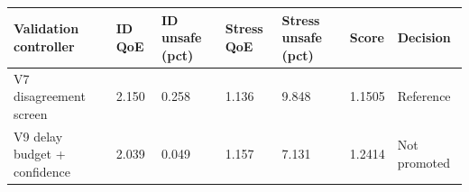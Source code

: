 \begin{tabular}{lllllll}
\toprule
Validation controller & ID QoE & ID unsafe (pct) & Stress QoE & Stress unsafe (pct) & Score & Decision \\
\midrule
V7 disagreement screen & 2.150 & 0.258 & 1.136 & 9.848 & 1.1505 & Reference \\
V9 delay budget + confidence & 2.039 & 0.049 & 1.157 & 7.131 & 1.2414 & Not promoted \\
\bottomrule
\end{tabular}

